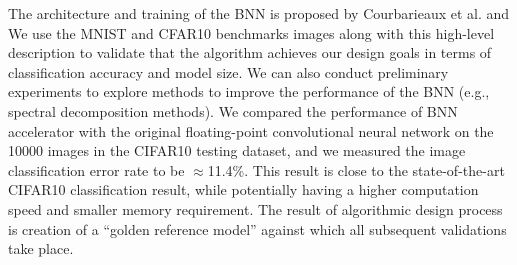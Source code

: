 The architecture and training of the BNN is proposed by Courbarieaux et al. and 
We use the
MNIST and CFAR10 benchmarks images along with this high-level description
to validate that the algorithm achieves our design goals in terms of
classification accuracy and model size. We can also conduct preliminary
experiments to explore methods to improve the performance of the BNN
(e.g., spectral decomposition methods). We compared the performance of
BNN accelerator with the original floating-point convolutional neural
network on the 10000 images in the CIFAR10 testing dataset, and we measured the image
classification error rate to be $\approx$11.4\%.  This result is close to the state-of-the-art CIFAR10
classification result, while potentially having a higher computation
speed and smaller memory requirement. The result of algorithmic design
process is creation of a ``golden reference model'' against which all
subsequent validations take place.





